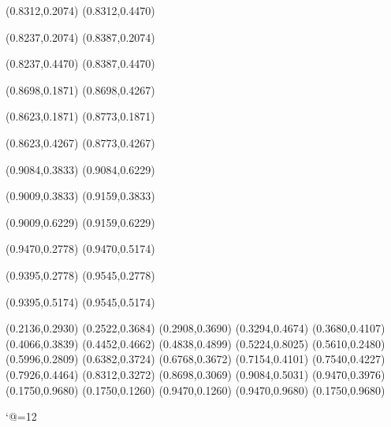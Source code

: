 \PST@Solid(0.8312,0.2074)
(0.8312,0.4470)

\PST@Solid(0.8237,0.2074)
(0.8387,0.2074)

\PST@Solid(0.8237,0.4470)
(0.8387,0.4470)

\PST@Solid(0.8698,0.1871)
(0.8698,0.4267)

\PST@Solid(0.8623,0.1871)
(0.8773,0.1871)

\PST@Solid(0.8623,0.4267)
(0.8773,0.4267)

\PST@Solid(0.9084,0.3833)
(0.9084,0.6229)

\PST@Solid(0.9009,0.3833)
(0.9159,0.3833)

\PST@Solid(0.9009,0.6229)
(0.9159,0.6229)

\PST@Solid(0.9470,0.2778)
(0.9470,0.5174)

\PST@Solid(0.9395,0.2778)
(0.9545,0.2778)

\PST@Solid(0.9395,0.5174)
(0.9545,0.5174)

\PST@Diamond(0.2136,0.2930)
\PST@Diamond(0.2522,0.3684)
\PST@Diamond(0.2908,0.3690)
\PST@Diamond(0.3294,0.4674)
\PST@Diamond(0.3680,0.4107)
\PST@Diamond(0.4066,0.3839)
\PST@Diamond(0.4452,0.4662)
\PST@Diamond(0.4838,0.4899)
\PST@Diamond(0.5224,0.8025)
\PST@Diamond(0.5610,0.2480)
\PST@Diamond(0.5996,0.2809)
\PST@Diamond(0.6382,0.3724)
\PST@Diamond(0.6768,0.3672)
\PST@Diamond(0.7154,0.4101)
\PST@Diamond(0.7540,0.4227)
\PST@Diamond(0.7926,0.4464)
\PST@Diamond(0.8312,0.3272)
\PST@Diamond(0.8698,0.3069)
\PST@Diamond(0.9084,0.5031)
\PST@Diamond(0.9470,0.3976)
\PST@Border(0.1750,0.9680)
(0.1750,0.1260)
(0.9470,0.1260)
(0.9470,0.9680)
(0.1750,0.9680)

\catcode`@=12
\fi
\endpspicture

